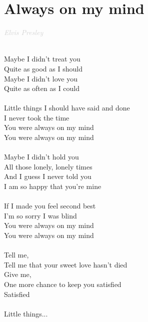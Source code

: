\documentclass[a5paper, 10pt]{book}
\begin{document}
\section{Always on my mind}\textcolor{lightgray}{\textit{Elvis Presley}}\\~\\
\begin{minipage}[t]{0.8\textwidth}
  Maybe I didn't treat you\\
  Quite as good as I should\\
  Maybe I didn't love you\\
  Quite as often as I could\\
  \\
  \hspace*{4mm}Little things I should have said and done\\
  \hspace*{4mm}I never took the time\\
  \hspace*{4mm}You were always on my mind\\
  \hspace*{4mm}You were always on my mind\\
  \\
  Maybe I didn't hold you\\
  All those lonely, lonely times\\
  And I guess I never told you\\
  I am so happy that you're mine\\
  \\
  \hspace*{4mm}If I made you feel second best\\
  \hspace*{4mm}I'm so sorry I was blind\\
  \hspace*{4mm}You were always on my mind\\
  \hspace*{4mm}You were always on my mind\\
  \\
  \hspace*{8mm}Tell me,\\
  \hspace*{8mm}Tell me that your sweet love hasn't died\\
  \hspace*{8mm}Give me,\\
  \hspace*{8mm}One more chance to keep you satisfied\\
  \hspace*{8mm}Satisfied\\
  \\
  \hspace*{4mm}Little things...\\
\end{minipage}
\end{document}
